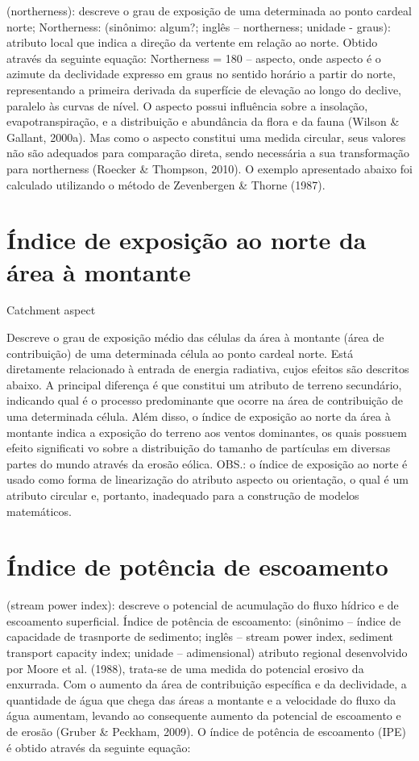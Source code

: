 \documentclass[]{book}
\begin{document}
(northerness): descreve o grau de exposição de uma determinada ao ponto
cardeal norte; Northerness: (sinônimo: algum?; inglês -- northerness;
unidade - graus): atributo local que indica a direção da vertente em
relação ao norte. Obtido através da seguinte equação: Northerness =
\textbar{}180 -- aspecto\textbar{}, onde aspecto é o azimute da
declividade expresso em graus no sentido horário a partir do norte,
representando a primeira derivada da superfície de elevação ao longo do
declive, paralelo às curvas de nível. O aspecto possui influência sobre
a insolação, evapotranspiração, e a distribuição e abundância da flora e
da fauna (Wilson \& Gallant, 2000a). Mas como o aspecto constitui uma
medida circular, seus valores não são adequados para comparação direta,
sendo necessária a sua transformação para northerness (Roecker \&
Thompson, 2010). O exemplo apresentado abaixo foi calculado utilizando o
método de Zevenbergen \& Thorne (1987).

\section{Índice de exposição ao norte da área à
montante}\label{indice-de-exposicao-ao-norte-da-area-a-montante}

Catchment aspect

Descreve o grau de exposição médio das células da área à montante (área
de contribuição) de uma determinada célula ao ponto cardeal norte. Está
diretamente relacionado à entrada de energia radiativa, cujos efeitos
são descritos abaixo. A principal diferença é que constitui um atributo
de terreno secundário, indicando qual é o processo predominante que
ocorre na área de contribuição de uma determinada célula. Além disso, o
índice de exposição ao norte da área à montante indica a exposição do
terreno aos ventos dominantes, os quais possuem efeito significati vo
sobre a distribuição do tamanho de partículas em diversas partes do
mundo através da erosão eólica. OBS.: o índice de exposição ao norte é
usado como forma de linearização do atributo aspecto ou orientação, o
qual é um atributo circular e, portanto, inadequado para a construção de
modelos matemáticos.

\section{Índice de potência de
escoamento}\label{indice-de-potencia-de-escoamento}

(stream power index): descreve o potencial de acumulação do ﬂuxo hídrico
e de escoamento superﬁcial. Índice de potência de escoamento: (sinônimo
-- índice de capacidade de trasnporte de sedimento; inglês -- stream
power index, sediment transport capacity index; unidade -- adimensional)
atributo regional desenvolvido por Moore et al. (1988), trata-se de uma
medida do potencial erosivo da enxurrada. Com o aumento da área de
contribuição específica e da declividade, a quantidade de água que chega
das áreas a montante e a velocidade do fluxo da água aumentam, levando
ao consequente aumento da potencial de escoamento e de erosão (Gruber \&
Peckham, 2009). O índice de potência de escoamento (IPE) é obtido
através da seguinte equação:
\end{document}
